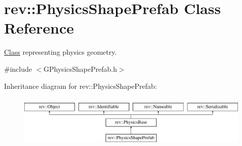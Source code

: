 \hypertarget{classrev_1_1_physics_shape_prefab}{}\section{rev\+::Physics\+Shape\+Prefab Class Reference}
\label{classrev_1_1_physics_shape_prefab}


\mbox{\hyperlink{struct_class}{Class}} representing physics geometry.  




{\ttfamily \#include $<$G\+Physics\+Shape\+Prefab.\+h$>$}

Inheritance diagram for rev\+::Physics\+Shape\+Prefab\+:\begin{figure}[H]
\begin{center}
\leavevmode
\includegraphics[height=2.576687cm]{classrev_1_1_physics_shape_prefab}
\end{center}
\end{figure}
